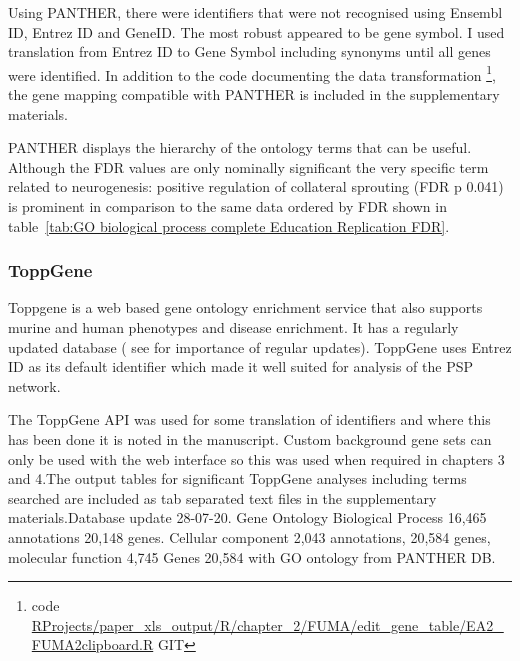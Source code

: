 




Using PANTHER, there were identifiers that were not recognised using Ensembl ID, Entrez ID and GeneID. The most robust appeared to be gene symbol. I used translation from Entrez ID to Gene Symbol including synonyms until all genes were identified. In addition to the code documenting the data transformation \footnote{code \url{ RProjects/paper_xls_output/R/chapter_2/FUMA/edit_gene_table/EA2_FUMA2clipboard.R} GIT}, the gene mapping compatible with PANTHER is included in the supplementary materials.

PANTHER displays the hierarchy of the ontology terms that can be useful. Although the FDR values are only nominally significant the very specific term related to neurogenesis: positive regulation of collateral sprouting (FDR p 0.041) is prominent in comparison to the same data ordered by FDR shown in table~\ref{tab:GO biological process complete Education Replication FDR}.

\subsubsection{ToppGene}
\label{sec:ToppGene GO enrichment}
 Toppgene is a web based gene ontology enrichment service that also supports murine and human phenotypes and disease enrichment\cite{chen2009toppgene}. It has a regularly updated database ( see \cite{tomczak2018interpretation} for importance of regular updates). ToppGene uses Entrez ID as its default identifier which made it well suited for analysis of the PSP network.
 
 The ToppGene API was used for some translation of identifiers and where this has been done it is noted in the manuscript. Custom background gene sets can only be used with the web interface so this was used when required in chapters 3 and 4.The output tables for significant ToppGene analyses including terms searched are included as tab separated text files  in the supplementary materials.Database update 28-07-20. Gene Ontology Biological Process 16,465 annotations 20,148 genes. Cellular component  2,043 annotations, 20,584 genes, molecular function 4,745 Genes 20,584 with GO ontology from PANTHER DB.  
 
